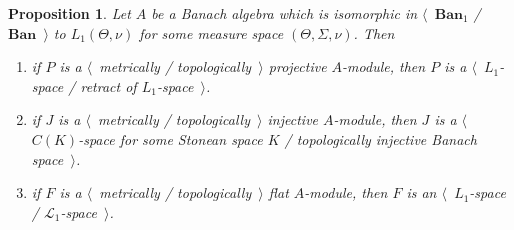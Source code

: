 \documentclass[12pt]{article}
\newtheorem{proposition}[theorem]{Proposition}
\begin{document}
\begin{proposition}\label{TopProjInjFlatModOverL1Charac} Let $A$ be a Banach
    algebra which is isomorphic in $\langle$~$\mathbf{Ban}_1$ /
    $\mathbf{Ban}$~$\rangle$ to $L_1(\Theta,\nu)$ for some measure space
    $(\Theta,\Sigma,\nu)$. Then
    \begin{enumerate}[label = (\roman*)]
        \item if $P$ is a $\langle$~metrically / topologically~$\rangle$
              projective $A$-module, then $P$ is a $\langle$~$L_1$-space /
              retract of $L_1$-space~$\rangle$.

        \item if $J$ is a $\langle$~metrically / topologically~$\rangle$
              injective $A$-module, then  $J$ is a $\langle$~$C(K)$-space for
              some Stonean space $K$ / topologically injective Banach
              space~$\rangle$.

        \item if $F$ is a $\langle$~metrically / topologically~$\rangle$ flat
              $A$-module, then $F$ is an $\langle$~$L_1$-space /
              $\mathscr{L}_1$-space~$\rangle$.
    \end{enumerate}
\end{proposition}
\end{document}
